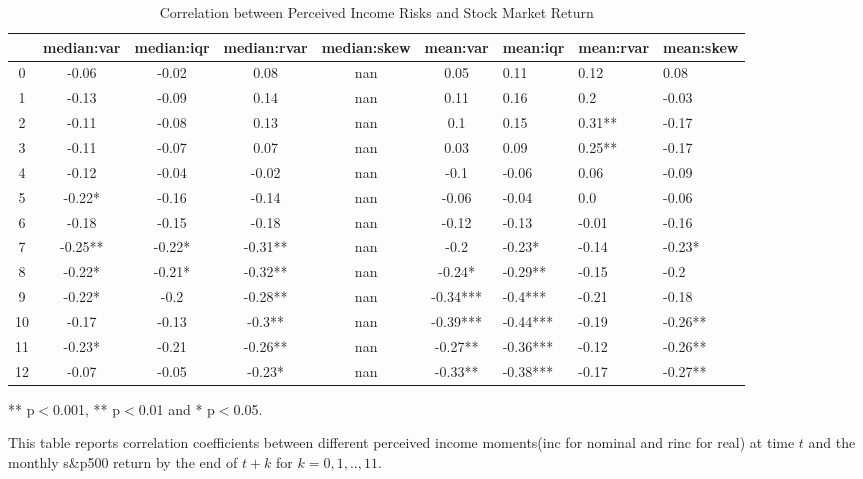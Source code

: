 
\begin{table}[ht]
\centering
\begin{adjustbox}{width={\textwidth}}
\begin{threeparttable}
\caption{Correlation between Perceived Income Risks and Stock Market Return}
\label{macro_corr}
\begin{tabular}{cccccclll}
\toprule
{} & median:var & median:iqr & median:rvar & median:skew &  mean:var &  mean:iqr & mean:rvar & mean:skew \\
\midrule
0  &      -0.06 &      -0.02 &        0.08 &         nan &      0.05 &      0.11 &      0.12 &      0.08 \\
1  &      -0.13 &      -0.09 &        0.14 &         nan &      0.11 &      0.16 &       0.2 &     -0.03 \\
2  &      -0.11 &      -0.08 &        0.13 &         nan &       0.1 &      0.15 &    0.31** &     -0.17 \\
3  &      -0.11 &      -0.07 &        0.07 &         nan &      0.03 &      0.09 &    0.25** &     -0.17 \\
4  &      -0.12 &      -0.04 &       -0.02 &         nan &      -0.1 &     -0.06 &      0.06 &     -0.09 \\
5  &     -0.22* &      -0.16 &       -0.14 &         nan &     -0.06 &     -0.04 &       0.0 &     -0.06 \\
6  &      -0.18 &      -0.15 &       -0.18 &         nan &     -0.12 &     -0.13 &     -0.01 &     -0.16 \\
7  &    -0.25** &     -0.22* &     -0.31** &         nan &      -0.2 &    -0.23* &     -0.14 &    -0.23* \\
8  &     -0.22* &     -0.21* &     -0.32** &         nan &    -0.24* &   -0.29** &     -0.15 &      -0.2 \\
9  &     -0.22* &       -0.2 &     -0.28** &         nan &  -0.34*** &   -0.4*** &     -0.21 &     -0.18 \\
10 &      -0.17 &      -0.13 &      -0.3** &         nan &  -0.39*** &  -0.44*** &     -0.19 &   -0.26** \\
11 &     -0.23* &      -0.21 &     -0.26** &         nan &   -0.27** &  -0.36*** &     -0.12 &   -0.26** \\
12 &      -0.07 &      -0.05 &      -0.23* &         nan &   -0.33** &  -0.38*** &     -0.17 &   -0.27** \\
\bottomrule
\end{tabular}
\begin{tablenotes}
\item *** p$<$0.001, ** p$<$0.01 and * p$<$0.05.
\item This table reports correlation coefficients between different perceived income moments(inc for nominal
and rinc for real) at time
$t$ and the monthly s\&p500 return by the end of $t+k$ for $k=0,1,..,11$.
\end{tablenotes}
\end{threeparttable}
\end{adjustbox}
\end{table}